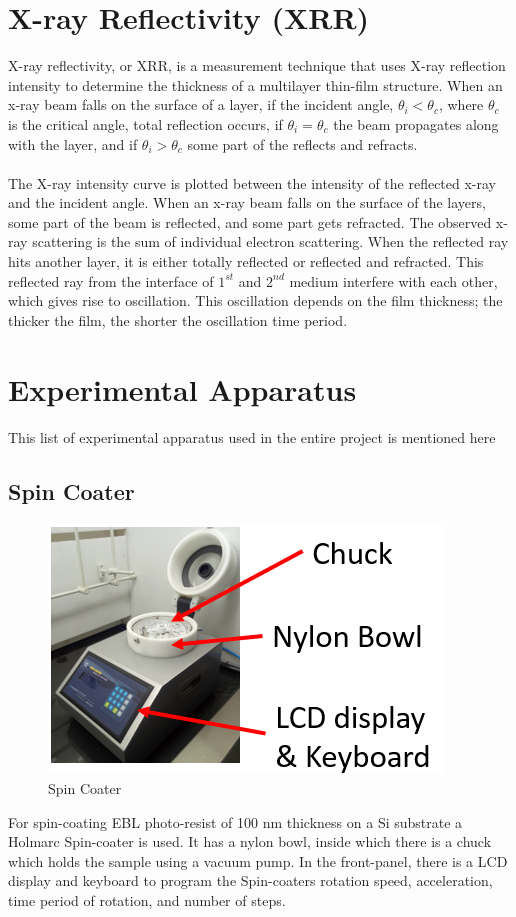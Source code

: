 \documentclass[12pt,a4paper,bold]{thesis}
\theoremstyle{thm}
\theoremstyle{definition}
\begin{document}
\section{X-ray Reflectivity (XRR)}
X-ray reflectivity, or XRR, is a measurement technique that uses X-ray reflection intensity to determine the thickness of a multilayer thin-film structure. 
When an x-ray beam falls on the surface of a layer, if the incident angle, $\theta_i<\theta_c$, where $\theta_c$ is the critical angle, total reflection occurs, if $\theta_i=\theta_c$ the beam propagates along with the layer, and if $\theta_i>\theta_c$ some part of the reflects and refracts.\\\\ 
The X-ray intensity curve is plotted between the intensity of the reflected x-ray and the incident angle. When an x-ray beam falls on the surface of the layers, some part of the beam is reflected, and some part gets refracted. The observed x-ray scattering is the sum of individual electron scattering. When the reflected ray hits another layer, it is either totally reflected or reflected and refracted. This reflected ray from the interface of $1^{st}$ and $2^{nd}$ medium interfere with each other, which gives rise to oscillation. This oscillation depends on the film thickness; the thicker the film, the shorter the oscillation time period.  
\section{Experimental Apparatus}
This list of experimental apparatus used in the entire project is mentioned here
\subsection{Spin Coater}
\begin{figure}[H]
	\centering
   \includegraphics[scale=0.56]{Images/4.png} 
   \caption{Spin Coater}
\end{figure}
For spin-coating EBL photo-resist of 100 nm thickness on a Si substrate a Holmarc Spin-coater is used. It has a nylon bowl, inside which there is a chuck which holds the sample using a vacuum pump. In the front-panel, there is a LCD display and keyboard to program the Spin-coaters rotation speed, acceleration, time period of rotation, and number of steps.
\end{document}
